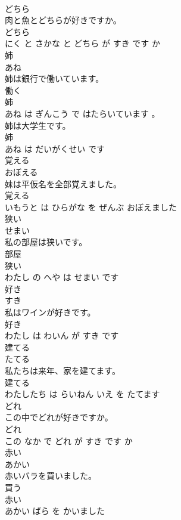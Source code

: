 \documentclass[8pt]{extreport}
\begin{document}
\begin{CJK}{UTF8}{min}
\\	どちら	
\\	肉と魚とどちらが好きですか。	
\\	どちら 
\\	にく と さかな と どちら が すき です か			
\\	姉	
\\	あね			
\\	姉は銀行で働いています。	
\\	働く 
\\	姉 
\\	あね は ぎんこう で はたらいています 。			
\\	姉は大学生です。	
\\	姉 
\\	あね は だいがくせい です			
\\	覚える	
\\	おぼえる			
\\	妹は平仮名を全部覚えました。	
\\	覚える 
\\	いもうと は ひらがな を ぜんぶ おぼえました			
\\	狭い	
\\	せまい			
\\	私の部屋は狭いです。	
\\	部屋 
\\	狭い 
\\	わたし の へや は せまい です			
\\	好き	
\\	すき			
\\	私はワインが好きです。	
\\	好き 
\\	わたし は わいん が すき です			
\\	建てる	
\\	たてる			
\\	私たちは来年、家を建てます。	
\\	建てる 
\\	わたしたち は らいねん いえ を たてます			
\\	どれ	
\\	この中でどれが好きですか。	
\\	どれ 
\\	この なか で どれ が すき です か			
\\	赤い	
\\	あかい			
\\	赤いバラを買いました。	
\\	買う 
\\	赤い 
\\	あかい ばら を かいました			

\end{CJK}
\end{document}
